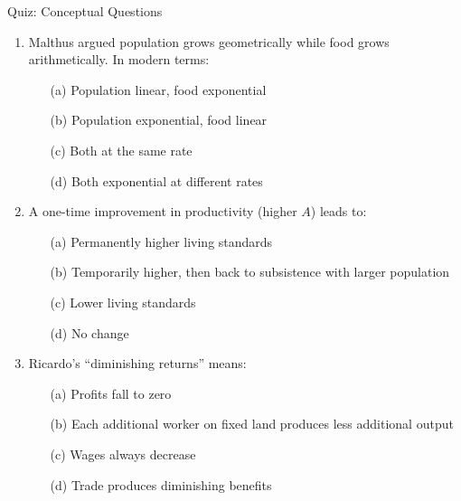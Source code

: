 \documentclass[aspectratio=169, 10pt]{beamer}
\begin{document}
\begin{frame}{Quiz: Conceptual Questions}
\begin{enumerate}
  \item Malthus argued population grows geometrically while food
        grows arithmetically. In modern terms:
        \begin{enumerate}
          \item[(a)] Population linear, food exponential
          \item[(b)] \alert{Population exponential, food linear}
          \item[(c)] Both at the same rate
          \item[(d)] Both exponential at different rates
        \end{enumerate}
  \item A one-time improvement in productivity (higher $A$) leads to:
        \begin{enumerate}
          \item[(a)] Permanently higher living standards
          \item[(b)] \alert{Temporarily higher, then back to subsistence
                     with larger population}
          \item[(c)] Lower living standards
          \item[(d)] No change
        \end{enumerate}
  \item Ricardo's ``diminishing returns'' means:
        \begin{enumerate}
          \item[(a)] Profits fall to zero
          \item[(b)] \alert{Each additional worker on fixed land produces
                     less additional output}
          \item[(c)] Wages always decrease
          \item[(d)] Trade produces diminishing benefits
        \end{enumerate}
\end{enumerate}
\end{frame}
\end{document}
